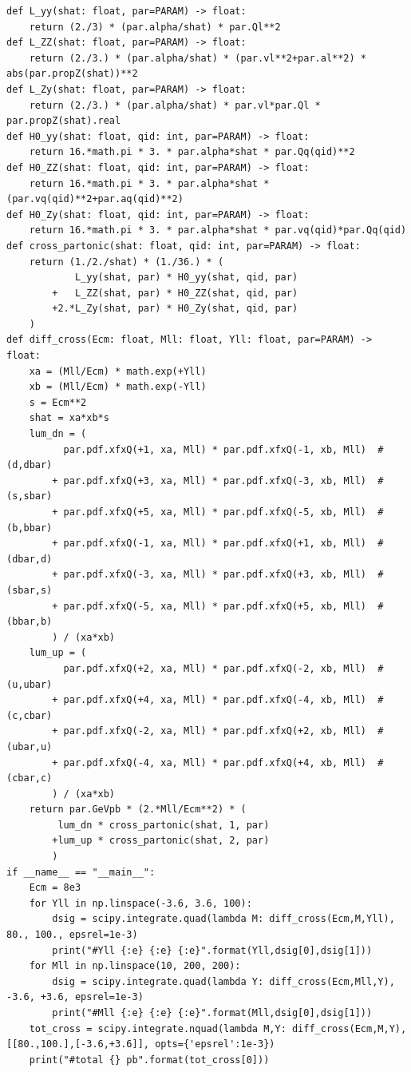 \documentclass[11pt]{article}
\begin{document}
\begin{verbatim}
def L_yy(shat: float, par=PARAM) -> float:
    return (2./3) * (par.alpha/shat) * par.Ql**2
def L_ZZ(shat: float, par=PARAM) -> float:
    return (2./3.) * (par.alpha/shat) * (par.vl**2+par.al**2) * abs(par.propZ(shat))**2
def L_Zy(shat: float, par=PARAM) -> float:
    return (2./3.) * (par.alpha/shat) * par.vl*par.Ql * par.propZ(shat).real
def H0_yy(shat: float, qid: int, par=PARAM) -> float:
    return 16.*math.pi * 3. * par.alpha*shat * par.Qq(qid)**2
def H0_ZZ(shat: float, qid: int, par=PARAM) -> float:
    return 16.*math.pi * 3. * par.alpha*shat * (par.vq(qid)**2+par.aq(qid)**2)
def H0_Zy(shat: float, qid: int, par=PARAM) -> float:
    return 16.*math.pi * 3. * par.alpha*shat * par.vq(qid)*par.Qq(qid)
def cross_partonic(shat: float, qid: int, par=PARAM) -> float:
    return (1./2./shat) * (1./36.) * (
            L_yy(shat, par) * H0_yy(shat, qid, par)
        +   L_ZZ(shat, par) * H0_ZZ(shat, qid, par)
        +2.*L_Zy(shat, par) * H0_Zy(shat, qid, par)
    )
def diff_cross(Ecm: float, Mll: float, Yll: float, par=PARAM) -> float:
    xa = (Mll/Ecm) * math.exp(+Yll)
    xb = (Mll/Ecm) * math.exp(-Yll)
    s = Ecm**2
    shat = xa*xb*s
    lum_dn = (
          par.pdf.xfxQ(+1, xa, Mll) * par.pdf.xfxQ(-1, xb, Mll)  # (d,dbar)
        + par.pdf.xfxQ(+3, xa, Mll) * par.pdf.xfxQ(-3, xb, Mll)  # (s,sbar)
        + par.pdf.xfxQ(+5, xa, Mll) * par.pdf.xfxQ(-5, xb, Mll)  # (b,bbar)
        + par.pdf.xfxQ(-1, xa, Mll) * par.pdf.xfxQ(+1, xb, Mll)  # (dbar,d)
        + par.pdf.xfxQ(-3, xa, Mll) * par.pdf.xfxQ(+3, xb, Mll)  # (sbar,s)
        + par.pdf.xfxQ(-5, xa, Mll) * par.pdf.xfxQ(+5, xb, Mll)  # (bbar,b)
        ) / (xa*xb)
    lum_up = (
          par.pdf.xfxQ(+2, xa, Mll) * par.pdf.xfxQ(-2, xb, Mll)  # (u,ubar)
        + par.pdf.xfxQ(+4, xa, Mll) * par.pdf.xfxQ(-4, xb, Mll)  # (c,cbar)
        + par.pdf.xfxQ(-2, xa, Mll) * par.pdf.xfxQ(+2, xb, Mll)  # (ubar,u)
        + par.pdf.xfxQ(-4, xa, Mll) * par.pdf.xfxQ(+4, xb, Mll)  # (cbar,c)
        ) / (xa*xb)
    return par.GeVpb * (2.*Mll/Ecm**2) * (
         lum_dn * cross_partonic(shat, 1, par)
        +lum_up * cross_partonic(shat, 2, par)
        )
if __name__ == "__main__":
    Ecm = 8e3
    for Yll in np.linspace(-3.6, 3.6, 100):
        dsig = scipy.integrate.quad(lambda M: diff_cross(Ecm,M,Yll), 80., 100., epsrel=1e-3)
        print("#Yll {:e} {:e} {:e}".format(Yll,dsig[0],dsig[1]))
    for Mll in np.linspace(10, 200, 200):
        dsig = scipy.integrate.quad(lambda Y: diff_cross(Ecm,Mll,Y), -3.6, +3.6, epsrel=1e-3)
        print("#Mll {:e} {:e} {:e}".format(Mll,dsig[0],dsig[1]))
    tot_cross = scipy.integrate.nquad(lambda M,Y: diff_cross(Ecm,M,Y), [[80.,100.],[-3.6,+3.6]], opts={'epsrel':1e-3})
    print("#total {} pb".format(tot_cross[0]))
\end{verbatim}
\end{document}
